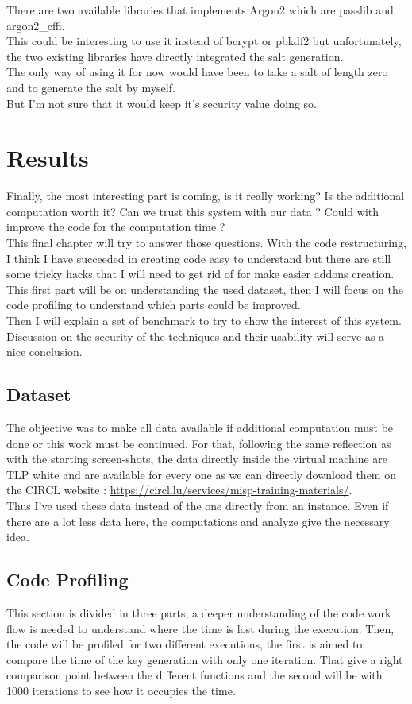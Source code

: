 \documentclass{eplmastersthesis}
\begin{document}
There are two available libraries that implements Argon2 which are passlib and argon2\_cffi.\\
This could be interesting to use it instead of bcrypt or pbkdf2 but unfortunately, the two existing libraries have directly integrated the salt generation. \\
The only way of using it for now would have been to take a salt of length zero and to generate the salt by myself. \\
But I'm not sure that it would keep it's security value doing so.

\chapter{Results}
Finally, the most interesting part is coming, is it really working? Is the additional computation worth it? Can we trust this system with our data ? Could with improve the code for the computation time ?\\
This final chapter will try to answer those questions. With the code restructuring, I think I have succeeded in creating code easy to understand but there are still some tricky hacks that I will need to get rid of for make easier addons creation.
This first part will be on understanding the used dataset, then I will focus on the code profiling to understand which parts could be improved.\\
Then I will explain a set of benchmark to try to show the interest of this system.\\
Discussion on the security of the techniques and their usability will serve as a nice conclusion.\\

\section{Dataset}
The objective was to make all data available if additional computation must be done or this work must be continued. For that, following the same reflection as with the starting screen-shots, the data directly inside the virtual machine are TLP white and are available for every one as we can directly download them on the CIRCL website : \url{https://circl.lu/services/misp-training-materials/}.\\
Thus I've used these data instead of the one directly from an instance. Even if there are a lot less data here, the computations and analyze give the necessary idea.

\section{Code Profiling}
This section is divided in three parts, a deeper understanding of the code work flow is needed to understand where the time is lost during the execution. Then, the code will be profiled for two different executions, the first is aimed to compare the time of the key generation with only one iteration. That give a right comparison point between the different functions and the second will be with 1000 iterations to see how it occupies the time. 
\end{document}
